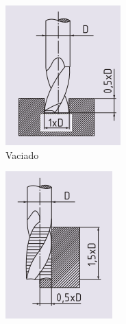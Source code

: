 \begin{figure}[hbt]
\begin{subfigure}{0.3\textwidth}
        \includegraphics[width=0.9\linewidth]{Cap4_DisenoBasico/Figura/Ranurado.PNG}
        \caption{Vaciado}
        \label{fig:VAciado}
    \end{subfigure} 
    \centering
    \begin{subfigure}{0.3\textwidth}
        \centering
        \includegraphics[width=0.9\linewidth]{Cap4_DisenoBasico/Figura/Basto.PNG}

\end{subfigure}
\end{figure}
